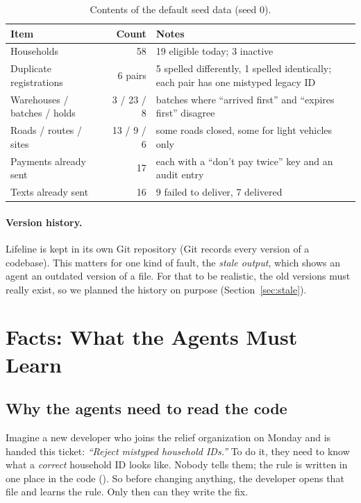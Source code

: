 \documentclass{article}
\newcommand{\code}[1]{\texttt{\detokenize{#1}}}
\begin{document}
\begin{table}[htbp]
\centering
\small
\caption{Contents of the default seed data (seed 0).}
\label{tab:seed}
\begin{tabularx}{\linewidth}{@{}lrL@{}}
\toprule
Item & Count & Notes \\
\midrule
Households & 58 & 19 eligible today; 3 inactive \\
Duplicate registrations & 6 pairs & 5 spelled differently, 1 spelled identically; each pair has one mistyped legacy ID \\
Warehouses / batches / holds & 3 / 23 / 8 & batches where ``arrived first'' and ``expires first'' disagree \\
Roads / routes / sites & 13 / 9 / 6 & some roads closed, some for light vehicles only \\
Payments already sent & 17 & each with a ``don't pay twice'' key and an audit entry \\
Texts already sent & 16 & 9 failed to deliver, 7 delivered \\
\bottomrule
\end{tabularx}
\end{table}

\paragraph{Version history.} Lifeline is kept in its own Git repository (Git records every version of a codebase). This matters for one kind of fault, the \emph{stale output}, which shows an agent an outdated version of a file. For that to be realistic, the old versions must really exist, so we planned the history on purpose (Section~\ref{sec:stale}).

\section{Facts: What the Agents Must Learn}
\label{sec:facts}

\subsection{Why the agents need to read the code}

Imagine a new developer who joins the relief organization on Monday and is handed this ticket: \emph{``Reject mistyped household IDs.''} To do it, they need to know what a \emph{correct} household ID looks like. Nobody tells them; the rule is written in one place in the code (\code{core/ids.py}). So before changing anything, the developer opens that file and learns the rule. Only then can they write the fix.
\end{document}

